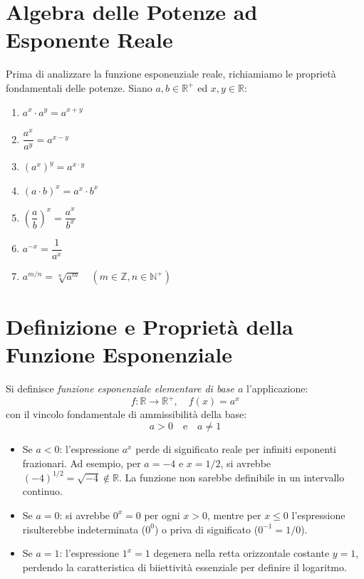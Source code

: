 \documentclass[11pt,a4paper,oneside]{report}
\begin{document}
\section{Algebra delle Potenze ad Esponente Reale}
Prima di analizzare la funzione esponenziale reale, richiamiamo le proprietà fondamentali delle potenze. Siano $a, b \in \mathbb{R}^+$ ed $x, y \in \mathbb{R}$:
\begin{enumerate}[label=\textbf{\arabic*.}]
    \item $a^x \cdot a^y = a^{x+y}$
    \item $\dfrac{a^x}{a^y} = a^{x-y}$
    \item $(a^x)^y = a^{x \cdot y}$
    \item $(a \cdot b)^x = a^x \cdot b^x$
    \item $\left(\dfrac{a}{b}\right)^x = \dfrac{a^x}{b^x}$
    \item $a^{-x} = \dfrac{1}{a^x}$
    \item $a^{m/n} = \sqrt[n]{a^m} \quad (m \in \mathbb{Z}, n \in \mathbb{N}^+)$
\end{enumerate}

\section{Definizione e Proprietà della Funzione Esponenziale}

\begin{definizione}
Si definisce \emph{funzione esponenziale elementare di base $a$} l'applicazione:
\begin{equation}
    f \colon \mathbb{R} \to \mathbb{R}^+, \quad f(x) = a^x
\end{equation}
con il vincolo fondamentale di ammissibilità della base:
\begin{equation}
    a > 0 \quad \text{e} \quad a \neq 1
\end{equation}
\end{definizione}

\begin{attenzione}
\begin{itemize}
    \item Se $a < 0$: l'espressione $a^x$ perde di significato reale per infiniti esponenti frazionari. Ad esempio, per $a = -4$ e $x = 1/2$, si avrebbe $(-4)^{1/2} = \sqrt{-4} \notin \mathbb{R}$. La funzione non sarebbe definibile in un intervallo continuo.
    \item Se $a = 0$: si avrebbe $0^x = 0$ per ogni $x > 0$, mentre per $x \le 0$ l'espressione risulterebbe indeterminata ($0^0$) o priva di significato ($0^{-1} = 1/0$).
    \item Se $a = 1$: l'espressione $1^x = 1$ degenera nella retta orizzontale costante $y = 1$, perdendo la caratteristica di biiettività essenziale per definire il logaritmo.
\end{itemize}
\end{attenzione}
\end{document}
